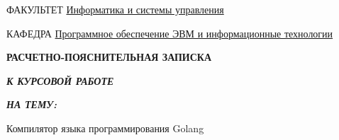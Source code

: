     \begin{center}
        \fontsize{12pt}{0.1\baselineskip}\selectfont
        \noindent\makebox[\linewidth]{\rule{\textwidth}{4pt}} \makebox[\linewidth]{\rule{\textwidth}{1pt}}
    \end{center}

    \begin{flushleft}
        \fontsize{12pt}{0.8\baselineskip}\selectfont

        ФАКУЛЬТЕТ {\expandafter \uline{
            Информатика и системы управления
            \hfill}}

        КАФЕДРА \uline{\mbox{\hspace{4mm}}
            Программное обеспечение ЭВМ и информационные технологии
            \hfill}
    \end{flushleft}

    \vfill

    \begin{center}
        \fontsize{20pt}{\baselineskip}\selectfont

        \textbf{РАСЧЕТНО-ПОЯСНИТЕЛЬНАЯ ЗАПИСКА}

        \textbf{\textit{К КУРСОВОЙ РАБОТЕ}}

        \textbf{\textit{НА ТЕМУ:}}
    \end{center}

    \begin{center}
        \fontsize{18pt}{0.6cm}\selectfont

        Компилятор языка программирования Golang

    \end{center}

    \vfill
    \vfill

